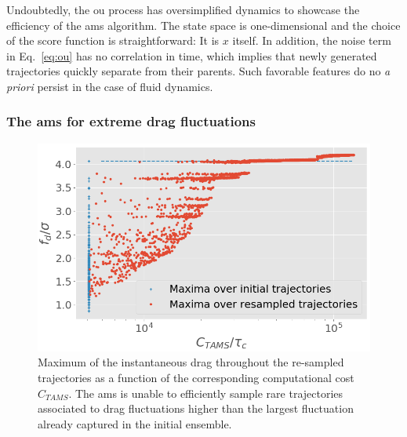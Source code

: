 \documentclass{jfm}
\begin{document}
Undoubtedly, the \acl{ou} process has oversimplified dynamics to showcase the efficiency of the \ac{ams} algorithm.
The state space is one-dimensional and the choice of the score function is straightforward: It is $x$ itself.
In addition, the noise term in Eq.~\eqref{eq:ou} has no correlation in time, which implies that newly generated trajectories quickly separate from their parents. Such favorable features do no \textit{a priori} persist in the case of fluid dynamics.


\subsubsection{The \ac{ams} for extreme drag fluctuations}
\label{sec:ams_drag}

\begin{figure}
	\centering
	\includegraphics[width=.7\linewidth]{AMS_drag_resampling/AMS_drag_resampling.png}
	\caption{\label{fig:AMS_drag_resampling} Maximum of the instantaneous drag throughout the re-sampled trajectories as a function of the corresponding computational cost $C_{TAMS}$. The \ac{ams} is unable to efficiently sample rare trajectories associated to drag fluctuations higher than the largest fluctuation already captured in the initial ensemble.}
\end{figure}
\end{document}
